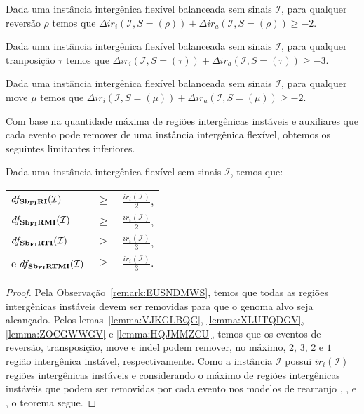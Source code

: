 \begin{lemma}\label{lemma:IERALSKC}
Dada uma instância intergênica flexível balanceada sem sinais $\mathcal{I}$, para qualquer reversão $\rho$ temos que $\Delta ir_i(\mathcal{I}, S = (\rho)) + \Delta ir_a(\mathcal{I}, S = (\rho)) \ge -2$.
\end{lemma}

\begin{lemma}\label{lemma:FOXQSODF}
Dada uma instância intergênica flexível balanceada sem sinais $\mathcal{I}$, para qualquer tranposição $\tau$ temos que $\Delta ir_i(\mathcal{I}, S = (\tau)) + \Delta ir_a(\mathcal{I}, S = (\tau)) \ge -3$.
\end{lemma}

\begin{lemma}\label{lemma:AXMNYRLB}
Dada uma instância intergênica flexível balanceada sem sinais $\mathcal{I}$, para qualquer move $\mu$ temos que $\Delta ir_i(\mathcal{I}, S = (\mu)) + \Delta ir_a(\mathcal{I}, S = (\mu)) \ge -2$.
\end{lemma}

Com base na quantidade máxima de regiões intergênicas instáveis e auxiliares que cada evento pode remover de uma instância intergênica flexível, obtemos os seguintes limitantes inferiores.

\begin{theorem}\label{theorem:BOTBXFZQ}
Dada uma instância intergênica flexível sem sinais $\mathcal{I}$, temos que:

\begin{tabular}{lll}
  $df_{\textbf{Sb\textsubscript{FI}RI}}(\mathcal{I})$     & $ \ge $ & $\frac{ir_i(\mathcal{I})}{2}$, \\
  $df_{\textbf{Sb\textsubscript{FI}RMI}}(\mathcal{I})$    & $ \ge $ & $\frac{ir_i(\mathcal{I})}{2}$, \\
  $df_{\textbf{Sb\textsubscript{FI}RTI}}(\mathcal{I})$    & $ \ge $ & $\frac{ir_i(\mathcal{I})}{3}$, \\
  e $df_{\textbf{Sb\textsubscript{FI}RTMI}}(\mathcal{I})$ & $ \ge $ & $\frac{ir_i(\mathcal{I})}{3}$. \\
\end{tabular}
\end{theorem}
\begin{proof}
Pela Observação~\ref{remark:EUSNDMWS}, temos que todas as regiões intergênicas instáveis devem ser removidas para que o genoma alvo seja alcançado. Pelos lemas~\ref{lemma:VJKGLBQG}, \ref{lemma:XLUTQDGV}, \ref{lemma:ZOCGWWGV} e \ref{lemma:HQJMMZCU}, temos que os eventos de reversão, transposição, move e indel podem remover, no máximo, $2$, $3$, $2$ e $1$ região intergênica instável, respectivamente. Como a instância $\mathcal{I}$ possui $ir_i(\mathcal{I})$ regiões intergênicas instáveis e considerando o máximo de regiões intergênicas instávéis que podem ser removidas por cada evento nos modelos de rearranjo \SbFIRI{}, \SbFIRMI{}, \SbFIRTI{} e \SbFIRTMI{}, o teorema segue.
\end{proof}


